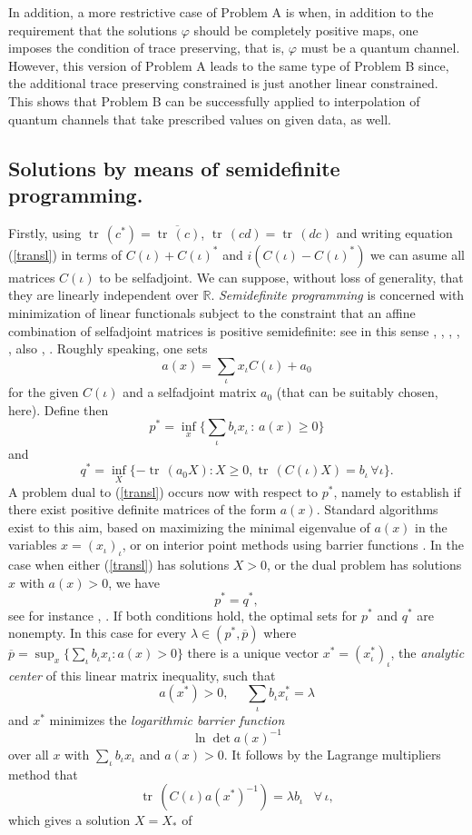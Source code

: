 \documentclass[12pt]{amsart}
\theoremstyle{definition}
\let\phi=\varphi
\begin{document}
In addition, a more restrictive case of Problem A is when, in addition to the 
requirement that the 
solutions $\phi$ should be completely positive maps, one imposes the condition of
trace preserving, that is, $\phi$ must be a quantum channel. However, this
version of Problem A leads to the same type of Problem B since, 
the additional trace preserving constrained is just another linear constrained. This 
shows that Problem B can be successfully applied to interpolation of quantum 
channels that take prescribed values on  given data, as well.

\subsection{Solutions by means of semidefinite programming.}\label{ss:smsp}
Firstly, using
 ${\operatorname{tr}}\, (c^* )=\overline{{\operatorname{tr}}\, (c)}$, ${\operatorname{tr}}\, (cd)={\operatorname{tr}}\, (dc)$ and writing equation (\ref{transl}) in terms of $C(\iota )+C(\iota )^*$  and
 $i(C(\iota )-C(\iota )^* )$  we can 
 asume  all  matrices $C(\iota )$ to be selfadjoint. 
We can  suppose, without loss of generality, 
that they are linearly independent over $\mathbb{R}$. 
 {\it Semidefinite programming} is concerned with 
minimization of linear functionals  subject to the constraint that an 
affine combination of selfadjoint matrices is positive semidefinite: see
in this sense \cite{Barvinok},  \cite{BoydGhaoui}, \cite{LundquistJohnson}, 
\cite{NesterovNemirovsky}, \cite{VanderbergheBoyd}, also 
\cite{BdGhFrBl}, \cite{GolubVanLoan}.  
Roughly speaking, one sets $$a(x)=\sum_\iota x_\iota C(\iota )+a_0$$ for the given 
$C(\iota )$ and a  selfadjoint matrix $a_0$ (that can be suitably chosen, here). Define then
$$
p^* =\inf_x \{ \sum_\iota b_\iota x_\iota  \, :\, a(x)\geq 0\}
$$
and
$$
q^* =\inf_X \{ -{\operatorname{tr}}\, (a_0 X): X\geq 0, {\operatorname{tr}}\, (C(\iota )X)=b_\iota\, \forall \iota \} .
$$
A problem dual to (\ref{transl}) occurs now with respect to $p^*$, namely to establish if there exist positive definite matrices of the form $a(x)$. Standard algorithms exist to this aim, based on maximizing the minimal eigenvalue of $a(x)$ in the variables $x=(x_\iota )_\iota$, or on  interior point methods using
 barrier functions \cite{NesterovNemirovsky}. 
In the case when either (\ref{transl}) has solutions $X>0$, or the dual problem has solutions $x$ with $a(x)>0$,
we have $$p^* =q^* ,$$ see for instance \cite{NesterovNemirovsky}, \cite{VanderbergheBoyd}. If both conditions hold, the optimal sets for $p^*$ and $q^*$ are nonempty. In this case for every $\lambda \in (p^* ,\overline{p})$ where $\overline{p}=\sup_x \{ \sum_\iota b_\iota x_\iota :a(x)>0\}$ there is a unique vector $x^* =(x_{\iota}^* )_\iota $, the {\it analytic center} of this linear matrix inequality, such that $$a(x^* )>0, \mbox{ }\mbox{  }\sum_\iota b_\iota x^{*}_\iota =\lambda$$ and $x^*$ minimizes the {\it logarithmic 
 barrier function} $$\ln \det a(x)^{-1}$$ over all $x$ with $\sum_\iota b_\iota x_\iota$ and $a(x)>0$. It follows by the Lagrange multipliers method that  $${\operatorname{tr}}\, (C(\iota )a(x^* )^{-1})=\lambda b_\iota \, \mbox{ }\forall \,
\iota ,$$ which gives a solution  $X=X_*$ of
\end{document}
